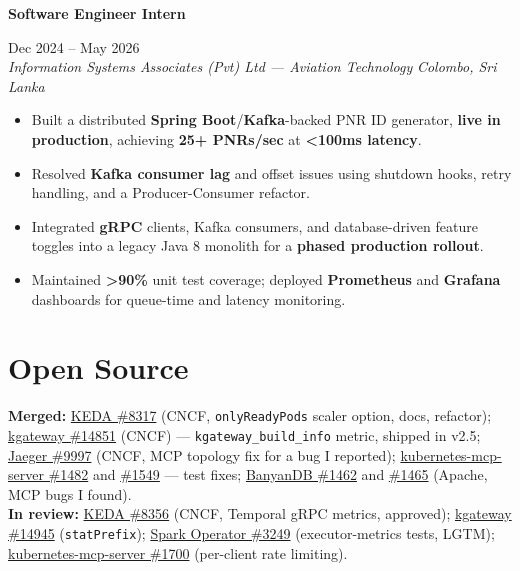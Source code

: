 \documentclass[a4paper,9pt]{extarticle}
\newcommand{\BigDivider}{}
\newcommand{\titleblock}[1]{%
  \begingroup
  \setlength{\fboxsep}{1pt}%
  \colorbox{BlockGray}{\strut\textbf{\textcolor{BlockText}{#1}}}%
  \endgroup
}
\newcommand{\kw}[1]{\textbf{#1}}
\newcommand{\skw}[1]{\textbf{#1}}
\newcommand{\CVExperienceEntry}[4]{
  \noindent \titleblock{#1} \hfill #2 \\
  \noindent \textit{#3} \hfill \textit{#4} \par\vspace{0.22em}
}
\begin{document}
\CVExperienceEntry
{Software Engineer Intern}
{Dec 2024 -- May 2026}
{Information Systems Associates (Pvt) Ltd --- Aviation Technology}
{Colombo, Sri Lanka}

\begin{itemize}[leftmargin=*, itemsep=0.2em, topsep=0.1em]
  \item Built a distributed \skw{Spring Boot}/\skw{Kafka}-backed PNR ID generator, \skw{live in production}, achieving \skw{25+ PNRs/sec} at \skw{<100ms latency}.
  \item Resolved \kw{Kafka consumer lag} and offset issues using shutdown hooks, retry handling, and a Producer-Consumer refactor.
  \item Integrated \kw{gRPC} clients, Kafka consumers, and database-driven feature toggles into a legacy Java 8 monolith for a \kw{phased production rollout}.
  \item Maintained \kw{>90\%} unit test coverage; deployed \kw{Prometheus} and \kw{Grafana} dashboards for queue-time and latency monitoring.
\end{itemize}
\vspace{0.12em}


\section*{Open Source}
\BigDivider
\small
\noindent
\kw{Merged:} \href{https://github.com/kedacore/keda/pull/8317}{KEDA \#8317} (CNCF, \texttt{onlyReadyPods} scaler option, docs, refactor);
\href{https://github.com/kgateway-dev/kgateway/pull/14851}{kgateway \#14851} (CNCF) --- \texttt{kgateway\_build\_info} metric, shipped in v2.5;
\href{https://github.com/jaegertracing/jaeger/pull/9997}{Jaeger \#9997} (CNCF, MCP topology fix for a bug I reported);
\href{https://github.com/containers/kubernetes-mcp-server/pull/1482}{kubernetes-mcp-server \#1482} and \href{https://github.com/containers/kubernetes-mcp-server/pull/1549}{\#1549} --- test fixes;
\href{https://github.com/apache/skywalking-banyandb/pull/1462}{BanyanDB \#1462} and \href{https://github.com/apache/skywalking-banyandb/pull/1465}{\#1465} (Apache, MCP bugs I found).\\
\kw{In review:} \href{https://github.com/kedacore/keda/pull/8356}{KEDA \#8356} (CNCF, Temporal gRPC metrics, approved);
\href{https://github.com/kgateway-dev/kgateway/pull/14945}{kgateway \#14945} (\texttt{statPrefix});
\href{https://github.com/kubeflow/spark-operator/pull/3249}{Spark Operator \#3249} (executor-metrics tests, LGTM);
\href{https://github.com/containers/kubernetes-mcp-server/pull/1700}{kubernetes-mcp-server \#1700} (per-client rate limiting).
\normalsize
\vspace{0.12em}
\end{document}
